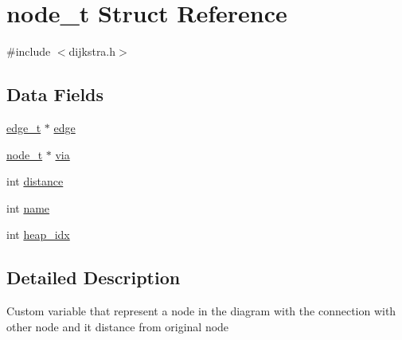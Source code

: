 \hypertarget{structnode__t}{\section{node\-\_\-t Struct Reference}
\label{structnode__t}
}


{\ttfamily \#include $<$dijkstra.\-h$>$}

\subsection*{Data Fields}
\begin{DoxyCompactItemize}
\item 
\hyperlink{structedge__t}{edge\-\_\-t} $\ast$ \hyperlink{structnode__t_a8d8005e1d452bd7077b820a041130148}{edge}
\item 
\hyperlink{structnode__t}{node\-\_\-t} $\ast$ \hyperlink{structnode__t_a74862fd7a526d25509757057abdf263d}{via}
\item 
int \hyperlink{structnode__t_a1566b5def5ac0cf6447a3b6100b56b7b}{distance}
\item 
int \hyperlink{structnode__t_ab187ac72fc7860f8786d13b53ea16917}{name}
\item 
int \hyperlink{structnode__t_a9b368412223df41a9589b84fd55d941c}{heap\-\_\-idx}
\end{DoxyCompactItemize}


\subsection{Detailed Description}
Custom variable that represent a node in the diagram with the connection with other node and it distance from original node 

